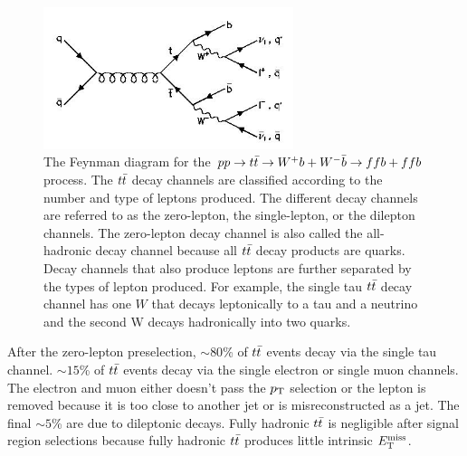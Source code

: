 \begin{figure}[h!]
  \centering
	\includegraphics[width=0.65\textwidth]{./figures/feynDiag/ttbar_decay.jpg}
\caption[The $\ttbar$ production and decay Feynman diagram.]{ The Feynman diagram for the $ pp \rightarrow t\bar{t} \rightarrow W^{+}b + W^{-}\bar{b} \rightarrow ffb+ffb$ process.  The $\ttbar$ decay channels are classified according to the number and type of leptons produced. The different decay channels are referred to as the zero-lepton, the single-lepton, or the dilepton channels. The zero-lepton decay channel is also called the all-hadronic decay channel because all $\ttbar$ decay products are quarks.  Decay channels that also produce leptons are further separated by the types of lepton produced.  For example, the single tau $\ttbar$ decay channel has one $W$ that decays leptonically to a tau and a neutrino and the second W decays hadronically into two quarks. }
\label{fig:ttbar:feynDiag}
\end{figure}

\indent After the zero-lepton preselection, $\sim80$\% of $\ttbar$ events decay via the single tau channel.  $\sim15$\% of $\ttbar$ events decay via the single electron or single muon channels.  The electron and muon either doesn't pass the $p_{\mathrm{T}}$ selection or the lepton is removed because it is too close to another jet or is misreconstructed as a jet. The final $\sim5$\% are due to dileptonic decays. Fully hadronic $\ttbar$ is negligible after signal region selections because fully hadronic $\ttbar$ produces little intrinsic $E_{\mathrm{T}}^{\mathrm{miss}}$. \\

